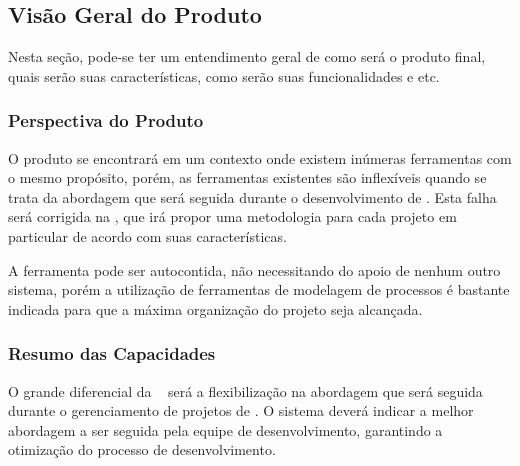 \subsection{Visão Geral do Produto}
	
Nesta seção, pode-se ter um entendimento geral de como será o produto final, quais serão suas características, como serão suas funcionalidades e etc.

\subsubsection{Perspectiva do Produto}
	
O produto se encontrará em um contexto onde existem inúmeras ferramentas com o mesmo propósito, porém, as ferramentas existentes são inflexíveis quando se trata da abordagem que será seguida durante o desenvolvimento de \sw. Esta falha será corrigida na \nomeferramenta, que irá propor uma metodologia para cada projeto em particular de acordo com suas características.

A ferramenta pode ser autocontida, não necessitando do apoio de nenhum outro sistema, porém a utilização de ferramentas de modelagem de processos é bastante indicada para que a máxima organização do projeto seja alcançada.

\subsubsection{Resumo das Capacidades}
	
O grande diferencial da \nomeferramenta~ será a flexibilização na abordagem que será seguida durante o gerenciamento de projetos de \sw. O sistema deverá indicar a melhor abordagem a ser seguida pela equipe de desenvolvimento, garantindo a otimização do processo de desenvolvimento.

